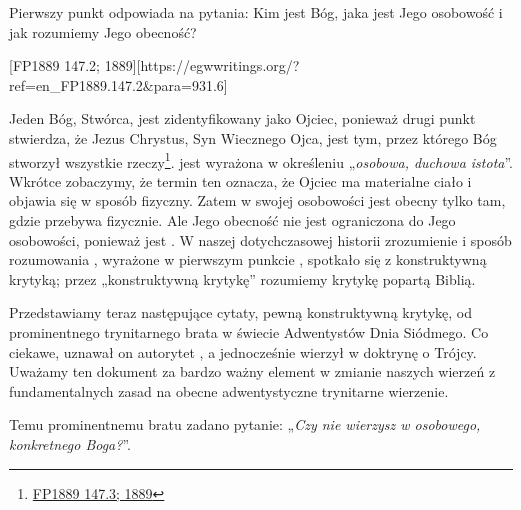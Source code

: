 
Pierwszy punkt  odpowiada na pytania: Kim jest Bóg, jaka jest Jego osobowość i jak rozumiemy Jego obecność?

[FP1889 147.2; 1889][https://egwwritings.org/?ref=en\_FP1889.147.2&para=931.6]

Jeden Bóg, Stwórca, jest zidentyfikowany jako Ojciec, ponieważ drugi punkt  stwierdza, że Jezus Chrystus, Syn Wiecznego Ojca, jest tym, przez którego Bóg stworzył wszystkie rzeczy\footnote{\href{https://egwwritings.org/?ref=en_FP1889.147.3&para=931.7}{FP1889 147.3; 1889}}.  jest wyrażona w określeniu „\textit{osobowa, duchowa istota}”. Wkrótce zobaczymy, że termin ten oznacza, że Ojciec ma materialne ciało i objawia się w sposób fizyczny. Zatem w swojej osobowości jest obecny tylko tam, gdzie przebywa fizycznie. Ale Jego obecność nie jest ograniczona do Jego osobowości, ponieważ jest . W naszej dotychczasowej historii zrozumienie i sposób rozumowania , wyrażone w pierwszym punkcie , spotkało się z konstruktywną krytyką; przez „konstruktywną krytykę” rozumiemy krytykę popartą Biblią.

Przedstawiamy teraz następujące cytaty, pewną konstruktywną krytykę, od prominentnego trynitarnego brata w świecie Adwentystów Dnia Siódmego. Co ciekawe, uznawał on autorytet , a jednocześnie wierzył w doktrynę o Trójcy. Uważamy ten dokument za bardzo ważny element w zmianie naszych wierzeń z fundamentalnych zasad na obecne adwentystyczne trynitarne wierzenie.

Temu prominentnemu bratu zadano pytanie: „\textit{Czy nie wierzysz w osobowego, konkretnego Boga?}”.


